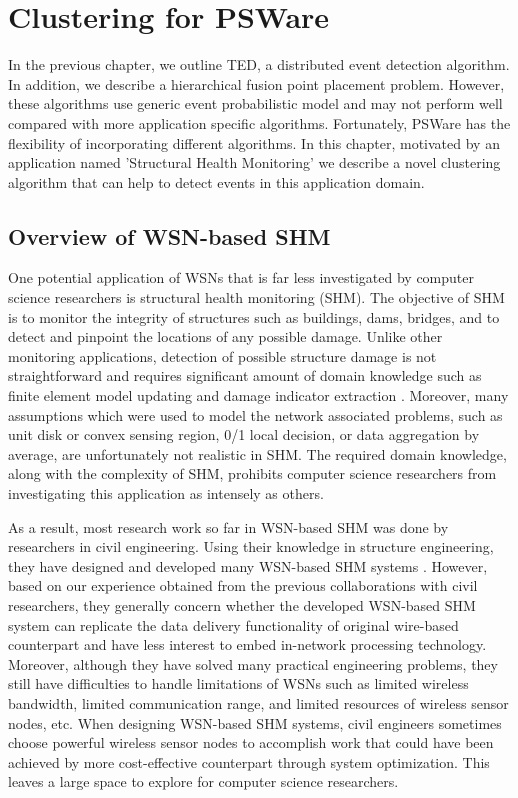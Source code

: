 \chapter{Clustering for PSWare}
\label{chapter:clustering}
In the previous chapter, we outline TED, a distributed event detection algorithm. In addition, we describe a hierarchical fusion point placement problem. However, these algorithms use generic event probabilistic model and may not perform well compared with more application specific algorithms. Fortunately, PSWare has the flexibility of incorporating different algorithms. In this chapter, motivated by an application named 'Structural Health Monitoring' we describe a novel clustering algorithm that can help to detect events in this application domain.

\section{Overview of WSN-based SHM}
One potential application of WSNs that is far less investigated by computer science researchers is structural health monitoring (SHM).  The objective of SHM is to monitor the integrity of structures such as buildings, dams, bridges, and to detect and pinpoint the locations of any possible damage. Unlike other monitoring applications, detection of possible structure damage is not straightforward and requires significant amount of domain knowledge such as finite element model updating and damage indicator extraction \cite{farrar2007introduction}. Moreover, many assumptions which were used to model the network associated problems, such as unit disk or convex sensing region, 0/1 local decision, or data aggregation by average, are unfortunately not realistic in SHM.  The required domain knowledge, along with the complexity of SHM, prohibits computer science researchers from investigating this application as intensely as others.

As a result, most research work so far in WSN-based SHM was done by researchers in civil engineering.  Using their knowledge in structure engineering, they have designed and developed many WSN-based SHM systems \cite{lynch2003embedment}\cite{nagayama2008structural}. However, based on our experience obtained from the previous collaborations with civil researchers, they generally concern whether the developed WSN-based SHM system can replicate the data delivery functionality of original wire-based counterpart and have less interest to embed in-network processing technology. Moreover, although they have solved many practical engineering problems, they still have difficulties to handle limitations of WSNs such as limited wireless bandwidth, limited communication range, and limited resources of wireless sensor nodes, etc.  When designing WSN-based SHM systems, civil engineers sometimes choose powerful wireless sensor nodes to accomplish work that could have been achieved by more cost-effective counterpart through system optimization. This leaves a large space to explore for computer science researchers.

